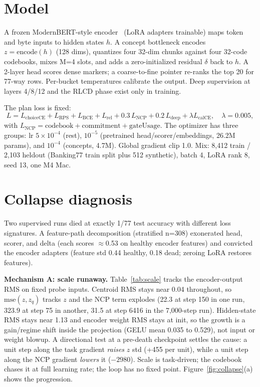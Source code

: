 \documentclass[11pt]{article}
\begin{document}
\section{Model}

A frozen ModernBERT-style encoder~\cite{modernbert2412} (LoRA adapters
trainable) maps token and byte inputs to hidden states $h$. A concept
bottleneck encodes $z = \mathrm{encode}(h)$ (128 dims), quantizes four
32-dim chunks against four 32-code codebooks, mixes M=4 slots, and adds a
zero-initialized residual $\delta$ back to $h$. A 2-layer head scores dense
markers; a coarse-to-fine pointer re-ranks the top 20 for 77-way rows.
Per-bucket temperatures calibrate the output. Deep supervision at layers
4/8/12 and the RLCD phase exist only in training.

The plan loss is fixed:
\begin{equation}
L = L_{\mathrm{choiceCE}} + L_{\mathrm{RPS}} + L_{\mathrm{BCE}} + L_{\mathrm{rel}}
+ 0.3\,L_{\mathrm{NCP}} + 0.2\,L_{\mathrm{deep}} + \lambda L_{\mathrm{calCE}},
\quad \lambda = 0.005,
\end{equation}
with $L_{\mathrm{NCP}} = \mathrm{codebook} + \mathrm{commitment} +
\mathrm{gateUsage}$. The optimizer has three groups: lr $5\times10^{-4}$
(rest), $10^{-5}$ (pretrained head/scorer/embeddings, 26.2M params), and
$10^{-4}$ (concepts, 4.7M). Global gradient clip 1.0. Mix: 8,412 train /
2,103 heldout (Banking77 train split plus 512 synthetic), batch 4, LoRA
rank 8, seed 13, one M4 Mac.

\section{Collapse diagnosis}

Two supervised runs died at exactly 1/77 test accuracy with different
loss signatures. A feature-path decomposition (stratified n=308) exonerated
head, scorer, and delta (each scores $\approx$0.53 on healthy encoder
features) and convicted the encoder adapters (feature std 0.44 healthy,
0.18 dead; zeroing LoRA restores features).

\textbf{Mechanism A: scale runaway.} Table~\ref{tab:scale} tracks the
encoder-output RMS on fixed probe inputs. Centroid RMS stays near 0.04
throughout, so $\mathrm{mse}(z, z_q)$ tracks $z$ and the NCP term explodes
(22.3 at step 150 in one run, 323.9 at step 75 in another, 31.5 at step
6416 in the 7,000-step run). Hidden-state RMS stays near 1.13 and encoder
weight RMS stays at init, so the growth is a gain/regime shift inside the
projection (GELU mean 0.035 to 0.529), not input or weight blowup. A
directional test at a pre-death checkpoint settles the cause: a unit step
along the task gradient \emph{raises} $z$ std (+455 per unit), while a unit
step along the NCP gradient \emph{lowers} it ($-2980$). Scale is
task-driven; the codebook chases it at full learning rate; the loop has no
fixed point. Figure~\ref{fig:collapse}(a) shows the progression.
\end{document}
